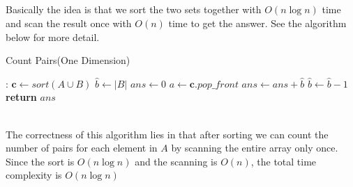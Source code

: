 \documentclass[12pt,letterpaper]{article}
\begin{document}
\subsection{}
Basically the idea is that we sort the two sets together with $O(n\log n)$ time and scan the result once with $O(n)$ time to get the answer. See the algorithm below for more detail.
\begin{algorithm}
    \caption{Count Pairs(One Dimension)}\label{alg:count1d}
    \begin{algorithmic}[1]
    :
    \State $\boldsymbol{c}\gets sort(A\cup B)$
    \State $\hat{b}\gets |B|$
    \State $ans\gets 0$
    \State $a\gets\boldsymbol{c}.pop\_front$
    \State $ans\gets ans+\hat{b}$
    \EndIf
    \State $\hat{b}\gets \hat{b}-1$
    \EndIf
    \EndWhile
    \State \textbf{return} $ans$
    \EndProcedure
    \end{algorithmic}
\end{algorithm}\\
The correctness of this algorithm lies in that after sorting we can count the number of pairs for each element in $A$ by scanning the entire array only once. Since the sort is $O(n\log n)$ and the scanning is $O(n)$, the total time complexity is $O(n\log n)$
\end{document}
